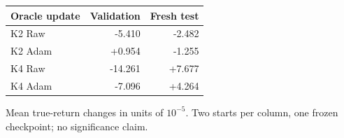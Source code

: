 \begin{center}\small
\begin{tabular}{lrr}\toprule
Oracle update & Validation & Fresh test\\\midrule
K2 Raw & -5.410 & -2.482 \\
K2 Adam & +0.954 & -1.255 \\
K4 Raw & -14.261 & +7.677 \\
K4 Adam & -7.096 & +4.264 \\
\bottomrule\end{tabular}
\par\smallskip Mean true-return changes in units of $10^{-5}$. Two starts per column, one frozen checkpoint; no significance claim.
\end{center}
